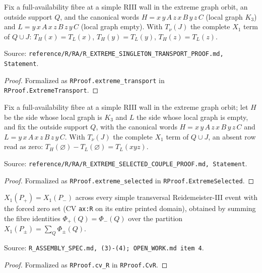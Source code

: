 \begin{obligation}\label{R:extreme_transport}\leanok
Fix a full-availability fibre at a simple RIII wall in the extreme graph orbit, an outside support $Q$, and the canonical
words $H=x\,y\,A\,z\,x\,B\,y\,z\,C$ (local graph $K_3$) and $L=y\,x\,A\,x\,z\,B\,z\,y\,C$ (local graph empty). With
$T_\nu(J)$ the complete $X_1$ term of $Q\cup J$: $T_H(x)=T_L(x)$, $T_H(y)=T_L(y)$, $T_H(z)=T_L(z)$.

Source: \texttt{reference/R/RA/R\_EXTREME\_SINGLETON\_TRANSPORT\_PROOF.md, Statement}.
\end{obligation}
\begin{proof}\leanok{}
Formalized as \texttt{RProof.extreme\_transport} in \texttt{RProof.ExtremeTransport}.
\end{proof}

\begin{obligation}\label{R:extreme_selected}\leanok
Fix a full-availability fibre at a simple RIII wall in the extreme graph orbit; let $H$ be the side whose local graph is
$K_3$ and $L$ the side whose local graph is empty, and fix the outside support $Q$, with the canonical words
$H=x\,y\,A\,z\,x\,B\,y\,z\,C$ and $L=y\,x\,A\,x\,z\,B\,z\,y\,C$. With $T_\nu(J)$ the complete $X_1$ term of $Q\cup J$, an
absent row read as zero: $T_H(\varnothing)-T_L(\varnothing)=T_L(xyz)$.

Source: \texttt{reference/R/RA/R\_EXTREME\_SELECTED\_COUPLE\_PROOF.md, Statement}.
\end{obligation}
\begin{proof}\leanok{}
Formalized as \texttt{RProof.extreme\_selected} in \texttt{RProof.ExtremeSelected}.
\end{proof}

\begin{obligation}\label{R:cv_theorem}\leanok
$X_1(P_+)=X_1(P_-)$ across every simple transversal Reidemeister-III event with the forced zero set (CV \texttt{ax:R}
on its entire printed domain), obtained by summing the fibre identities $\Phi_+(Q)=\Phi_-(Q)$ over the partition
$X_1(P_\pm)=\sum_Q\Phi_\pm(Q)$.

Source: \texttt{R\_ASSEMBLY\_SPEC.md, (3)-(4); OPEN\_WORK.md item 4}.
\end{obligation}
\begin{proof}\leanok{}
Formalized as \texttt{RProof.cv\_R} in \texttt{RProof.CvR}.
\end{proof}

